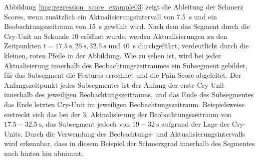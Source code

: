 Abbildung \ref{img:regression_score_example03} zeigt die Ableitung der Schmerz Scores, wenn zusätzlich ein Aktualisierungsintervall von \SI{7.5}{\second} und ein Beobachtungszeitraum von \SI{15}{\second} gewählt wird. Nach dem das Segment durch die Cry-Unit an Sekunde 10 eröffnet wurde, werden Aktualisierungen zu den Zeitpunkten $t = \SI{17.5}{\second}, \SI{25}{\second}, \SI{32.5}{\second}$ und \SI{40}{\second} durchgeführt, verdeutlicht durch die kleinen, roten Pfeile in der Abbildung. Wie zu sehen ist, wird bei jeder Aktualisierung innerhalb des Beobachtungszeitraumes ein Subsegment gebildet, für das Subsegment die Features errechnet und die Pain Score abgeleitet. Der Anfangszeitpunkt jedes Subsegmentes ist der Anfang der erste Cry-Unit innerhalb des jeweiligen Beobachtungszeitraums, und das Ende des Subsegmentes das Ende letzten Cry-Unit im jeweiligen Beobachtungszeitraum. Beispielsweise erstreckt sich das bei der 3. Aktualisierung der Beobachtungszeitraum von $17.5 - \SI{32.5}{\second}$, das Subsegment jedoch von $19 - \SI{32}{\second}$ aufgrund der Lage der Cry-Units. Durch die Verwendung des Beobachtungs- und Aktualisierungsintervalls wird erkennbar, dass in diesem Beispiel der Schmerzgrad innerhalb des Segmentes nach hinten hin abnimmt.


